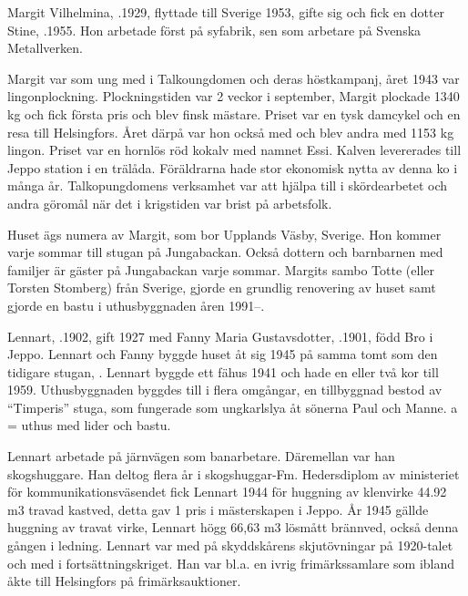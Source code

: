 


Margit Vilhelmina, .1929, flyttade till Sverige 1953, gifte sig och fick en dotter Stine, .1955. Hon arbetade först på syfabrik, sen som arbetare på Svenska Metallverken.

Margit var som ung med i Talkoungdomen och deras höstkampanj, året 1943 var lingonplockning. Plockningstiden var 2 veckor i september, Margit plockade 1340 kg och fick första pris och blev finsk mästare. Priset var en tysk damcykel och en resa till Helsingfors. Året därpå var hon också med och blev andra med 1153 kg lingon. Priset var en hornlös röd kokalv med namnet Essi. Kalven levererades till Jeppo station i en trälåda. Föräldrarna hade stor ekonomisk nytta av denna ko i många år. Talkopungdomens verksamhet var att hjälpa till i skördearbetet och andra göromål när det i krigstiden var brist på arbetsfolk.

Huset ägs numera av Margit, som bor Upplands Väsby, Sverige. Hon kommer varje sommar till stugan på Jungabackan. Också dottern och barnbarnen med familjer är gäster på Jungabackan varje sommar. Margits sambo Totte (eller Torsten Stomberg)  från Sverige, gjorde en grundlig renovering av huset samt gjorde en bastu i uthusbyggnaden åren 1991--.



Lennart, .1902, gift 1927 med Fanny Maria Gustavsdotter, .1901, född Bro i Jeppo. Lennart och Fanny byggde huset åt sig 1945 på samma tomt som den tidigare stugan, . Lennart byggde ett fähus 1941 och hade en eller två kor till 1959. Uthusbyggnaden byggdes till i flera omgångar, en tillbyggnad bestod av ``Timperis'' stuga, som fungerade som ungkarlslya åt sönerna Paul och Manne. a = uthus med lider och bastu.

Lennart arbetade på järnvägen som banarbetare. Däremellan var han skogshuggare. Han deltog flera år i skogshuggar-Fm. Hedersdiplom av ministeriet för kommunikationsväsendet fick Lennart 1944 för huggning av klenvirke 44.92 m3 travad  kastved, detta gav 1 pris i mästerskapen i Jeppo. År 1945 gällde huggning av travat virke, Lennart högg 66,63 m3 lösmått brännved, också denna gången i ledning. Lennart var med på skyddskårens skjutövningar på 1920-talet och med i 	fortsättningskriget. Han var bl.a. en ivrig frimärkssamlare som ibland åkte till Helsingfors på frimärksauktioner.

